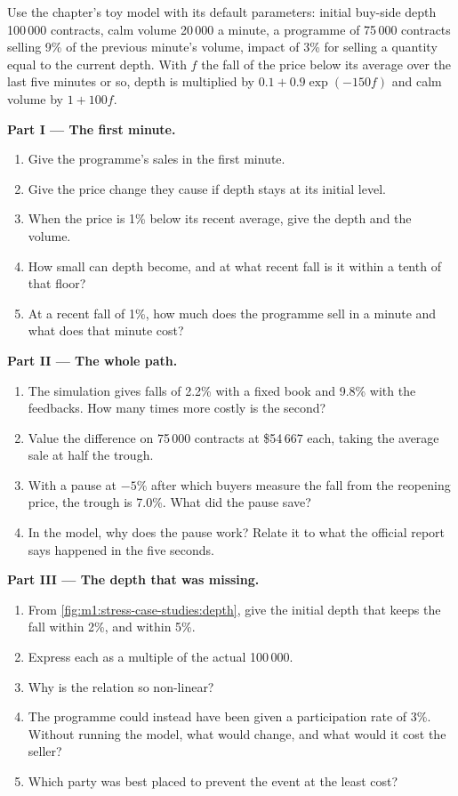 \begin{problem}\label{pb:m1:stress-case-studies:1}
Use the chapter's toy model with its default parameters: initial buy-side
depth 100\,000 contracts, calm volume 20\,000 a minute, a programme of 75\,000
contracts selling 9\% of the previous minute's volume, impact of 3\% for
selling a quantity equal to the current depth. With $f$ the fall of the price
below its average over the last five minutes or so, depth is multiplied by
$0.1 + 0.9\exp(-150 f)$ and calm volume by $1 + 100 f$.

\medskip\noindent\textbf{Part I --- The first minute.}
\begin{enumerate}
\item Give the programme's sales in the first minute.
\item Give the price change they cause if depth stays at its initial level.
\item When the price is 1\% below its recent average, give the depth and the
volume.
\item How small can depth become, and at what recent fall is it within a
tenth of that floor?
\item At a recent fall of 1\%, how much does the programme sell in a minute
and what does that minute cost?
\end{enumerate}

\medskip\noindent\textbf{Part II --- The whole path.}
\begin{enumerate}[resume]
\item The simulation gives falls of 2.2\% with a fixed book and 9.8\% with the
feedbacks. How many times more costly is the second?
\item Value the difference on 75\,000 contracts at \$54\,667 each, taking the
average sale at half the trough.
\item With a pause at $-5\%$ after which buyers measure the fall from the
reopening price, the trough is 7.0\%. What did the pause save?
\item In the model, why does the pause work? Relate it to what the official
report says happened in the five seconds.
\end{enumerate}

\medskip\noindent\textbf{Part III --- The depth that was missing.}
\begin{enumerate}[resume]
\item From \cref{fig:m1:stress-case-studies:depth}, give the initial depth
that keeps the fall within 2\%, and within 5\%.
\item Express each as a multiple of the actual 100\,000.
\item Why is the relation so non-linear?
\item The programme could instead have been given a participation rate of
3\%. Without running the model, what would change, and what would it cost the
seller?
\item Which party was best placed to prevent the event at the least cost?
\end{enumerate}


\end{problem}

